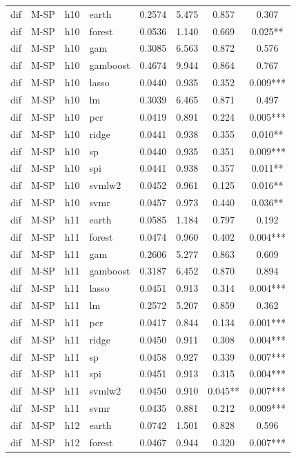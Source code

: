 \begin{ThreePartTable}
\begin{longtable}[t]{llclcccc}
\addlinespace
dif & M-SP & h10 & earth & 0.2574 & 5.475 & 0.857 & 0.307\\
dif & M-SP & h10 & forest & 0.0536 & 1.140 & 0.669 & 0.025**\\
dif & M-SP & h10 & gam & 0.3085 & 6.563 & 0.872 & 0.576\\
dif & M-SP & h10 & gamboost & 0.4674 & 9.944 & 0.864 & 0.767\\
dif & M-SP & h10 & lasso & 0.0440 & 0.935 & 0.352 & 0.009***\\
dif & M-SP & h10 & lm & 0.3039 & 6.465 & 0.871 & 0.497\\
dif & M-SP & h10 & pcr & 0.0419 & 0.891 & 0.224 & 0.005***\\
dif & M-SP & h10 & ridge & 0.0441 & 0.938 & 0.355 & 0.010**\\
dif & M-SP & h10 & sp & 0.0440 & 0.935 & 0.351 & 0.009***\\
dif & M-SP & h10 & spi & 0.0441 & 0.938 & 0.357 & 0.011**\\
dif & M-SP & h10 & svmlw2 & 0.0452 & 0.961 & 0.125 & 0.016**\\
dif & M-SP & h10 & svmr & 0.0457 & 0.973 & 0.440 & 0.036**\\
\addlinespace
dif & M-SP & h11 & earth & 0.0585 & 1.184 & 0.797 & 0.192\\
dif & M-SP & h11 & forest & 0.0474 & 0.960 & 0.402 & 0.004***\\
dif & M-SP & h11 & gam & 0.2606 & 5.277 & 0.863 & 0.609\\
dif & M-SP & h11 & gamboost & 0.3187 & 6.452 & 0.870 & 0.894\\
dif & M-SP & h11 & lasso & 0.0451 & 0.913 & 0.314 & 0.004***\\
dif & M-SP & h11 & lm & 0.2572 & 5.207 & 0.859 & 0.362\\
dif & M-SP & h11 & pcr & 0.0417 & 0.844 & 0.134 & 0.001***\\
dif & M-SP & h11 & ridge & 0.0450 & 0.911 & 0.308 & 0.004***\\
dif & M-SP & h11 & sp & 0.0458 & 0.927 & 0.339 & 0.007***\\
dif & M-SP & h11 & spi & 0.0451 & 0.913 & 0.315 & 0.004***\\
dif & M-SP & h11 & svmlw2 & 0.0450 & 0.910 & 0.045** & 0.007***\\
dif & M-SP & h11 & svmr & 0.0435 & 0.881 & 0.212 & 0.009***\\
\addlinespace
dif & M-SP & h12 & earth & 0.0742 & 1.501 & 0.828 & 0.596\\
dif & M-SP & h12 & forest & 0.0467 & 0.944 & 0.320 & 0.007***\\

\end{longtable}
\end{ThreePartTable}
